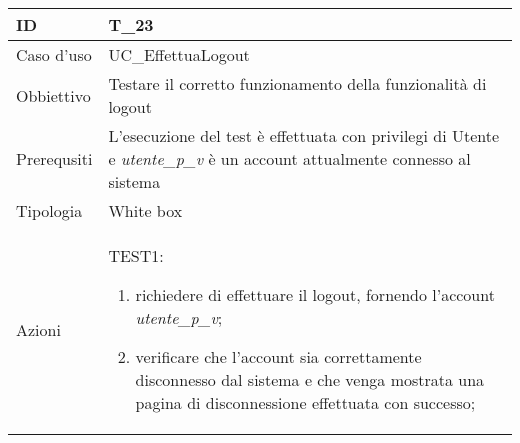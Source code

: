 \begin{table}[hb]
    \centering
    \begin{tabular}{ |p{2cm}|p{10cm}|  }
        \hline
        ID          & T\_23                                                                                                                         \\\hline
        Caso d'uso  & UC\_EffettuaLogout                                                                                                            \\\hline
        Obbiettivo  & Testare il corretto funzionamento della funzionalità di logout                                                                \\\hline
        Prerequsiti & L'esecuzione del test è effettuata con privilegi di Utente e \emph{utente\_p\_v} è un account attualmente connesso al sistema \\\hline
        Tipologia   & White box                                                                                                                     \\\hline
        Azioni      &
        TEST1:
        \begin{enumerate}[nosep, topsep=0pt]
            \item richiedere di effettuare il logout, fornendo l'account \emph{utente\_p\_v};
            \item verificare che l'account sia correttamente disconnesso dal sistema e che venga mostrata una pagina di disconnessione effettuata con successo;
        \end{enumerate}
        \\\hline
    \end{tabular}
\end{table}

